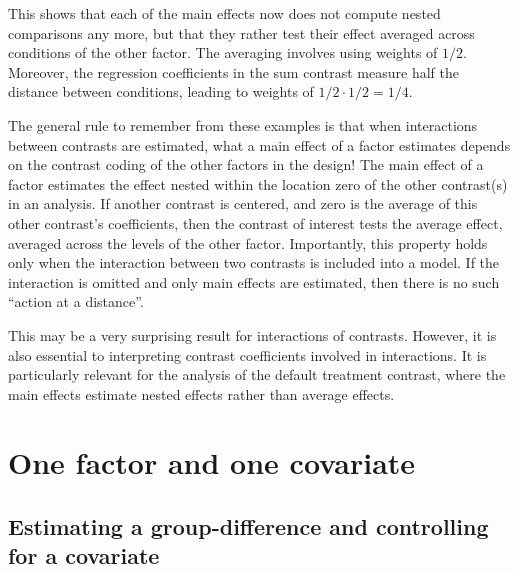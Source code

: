 \documentclass[
  12pt,
]{krantz}
\theoremstyle{definition}
\theoremstyle{definition}
\theoremstyle{definition}
\theoremstyle{definition}
\theoremstyle{remark}
\begin{document}
This shows that each of the main effects now does not compute nested comparisons any more, but that they rather test their effect averaged across conditions of the other factor. The averaging involves using weights of \(1/2\). Moreover, the regression coefficients in the sum contrast measure half the distance between conditions, leading to weights of \(1/2 \cdot 1/2 = 1/4\).

The general rule to remember from these examples is that when interactions between contrasts are estimated, what a main effect of a factor estimates depends on the contrast coding of the other factors in the design! The main effect of a factor estimates the effect nested within the location zero of the other contrast(s) in an analysis. If another contrast is centered, and zero is the average of this other contrast's coefficients, then the contrast of interest tests the average effect, averaged across the levels of the other factor. Importantly, this property holds only when the interaction between two contrasts is included into a model. If the interaction is omitted and only main effects are estimated, then there is no such ``action at a distance''.

This may be a very surprising result for interactions of contrasts. However, it is also essential to interpreting contrast coefficients involved in interactions. It is particularly relevant for the analysis of the default treatment contrast, where the main effects estimate nested effects rather than average effects.

\hypertarget{sec:contrast:covariate}{%
\section{One factor and one covariate}\label{sec:contrast:covariate}}

\hypertarget{estimating-a-group-difference-and-controlling-for-a-covariate}{%
\subsection{Estimating a group-difference and controlling for a covariate}\label{estimating-a-group-difference-and-controlling-for-a-covariate}}
\end{document}
